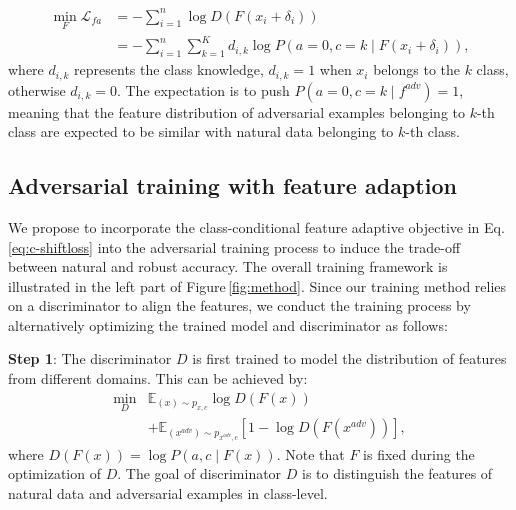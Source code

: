 \documentclass[10pt,twocolumn,letterpaper]{article}
\begin{document}
\begin{equation}
\begin{aligned}
\label{eq:c-shiftloss}
		\min _{F}\mathcal{L}_{fa}&=-\sum \limits_{i=1} ^{n} \log D( F(x_i+\delta_i))\\
		&=-\sum \limits_{i=1} ^{n}\sum \limits_{k=1} ^{K}d_{i,k}\log P(a=0, c=k\mid F(x_i+\delta_i)),
\end{aligned}
\end{equation}
where $d_{i,k}$ represents the class knowledge, $d_{i,k}=1$ when $x_i$ belongs to the $k$ class, otherwise $d_{i,k}=0$. The expectation is to push $P(a=0,c=k\mid f^{adv}) = 1$, meaning that the feature distribution of adversarial examples belonging to $k$-th class are expected to be similar with natural data belonging to $k$-th class. 



\subsection{Adversarial training with feature adaption}

We propose to incorporate the class-conditional feature adaptive objective in Eq.\,\eqref{eq:c-shiftloss} into the adversarial training process to induce the trade-off between natural and robust accuracy. The overall training framework is illustrated in the left part of Figure\,\ref{fig:method}. Since our training method relies on a discriminator to align the features, we conduct the training process by alternatively optimizing the trained model and discriminator as follows:

\textbf{Step 1}: The discriminator $D$ is first trained to model the distribution of features from different domains. This can be achieved by:
\begin{equation}
\begin{aligned}
\label{eq:dloss}
		\min _{D}&\mathbb{E}_{(x) \sim p_{x,c}}\log D(F(x))\\
		&+\mathbb{E}_{(x^{adv}) \sim p_{x^{adv},c}}[1-\log D(F(x^{adv}))],
\end{aligned}
\end{equation}
where $D(F(x))=\log P(a, c\mid F(x))$. Note that $F$ is fixed during the optimization of $D$. The goal of discriminator $D$ is to distinguish the features of natural data and adversarial examples in class-level.
\end{document}
